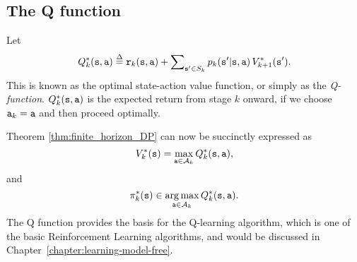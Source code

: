 \subsection{The Q function}
Let
\[{Q^*_k}(\state,\action) \buildrel \Delta \over = {\reward_k}(\state,\action) + \sum\nolimits_{\state' \in {S_k}} {{p_k}(\state'|\state,\action)\,V_{k+1}^{*}(\state')} .\]
This is known as the optimal state-action value function, or simply
as the \emph{Q-function}. ${Q^*_k}({\tt s},{\tt a})$ is the expected
return from stage $k$ onward, if we choose ${{\tt a}_k} = {\tt a}$
and then proceed optimally.

Theorem \ref{thm:finite_horizon_DP} can now be succinctly expressed as
\[V_k^{*}({\tt s}) = \mathop {\max }\limits_{{\tt a} \in {\mathcal{A}_k}} {Q^*_k}({\tt s},{\tt a}),\]
and
\[\pi _k^*({\tt s}) \in \mathop {\arg \max }\limits_{{\tt a} \in {\mathcal{A}_k}} {Q^*_k}({\tt s},{\tt a}).\]
The Q function provides the basis for the Q-learning algorithm,
which is one of the basic Reinforcement Learning algorithms, and
would be discussed in Chapter~\ref{chapter:learning-model-free}.









